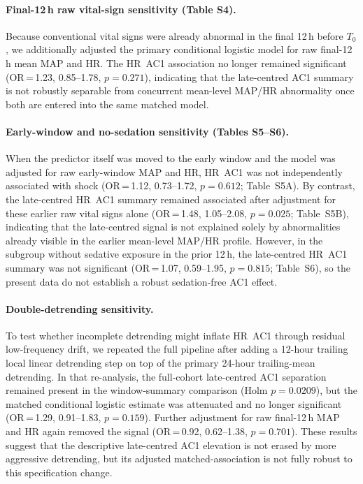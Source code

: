 \documentclass[referee,lineno,pdflatex]{sn-article-template/sn-jnl}
\begin{document}
\paragraph{Final-12\,h raw vital-sign sensitivity (Table S4).}
Because conventional vital signs were already abnormal in the final 12\,h before $T_0$,
we additionally adjusted the primary conditional logistic model for raw final-12\,h
mean MAP and HR.
The HR~AC1 association no longer remained significant
(OR\,=\,1.23, 0.85--1.78, $p=0.271$),
indicating that the late-centred AC1 summary is not robustly separable from concurrent mean-level MAP/HR
abnormality once both are entered into the same matched model.

\paragraph{Early-window and no-sedation sensitivity (Tables S5--S6).}
When the predictor itself was moved to the early window and the model was adjusted for
raw early-window MAP and HR, HR~AC1 was not independently associated with shock
(OR\,=\,1.12, 0.73--1.72, $p=0.612$; Table~S5A).
By contrast, the late-centred HR~AC1 summary remained associated after adjustment for these earlier
raw vital signs alone (OR\,=\,1.48, 1.05--2.08, $p=0.025$; Table~S5B),
indicating that the late-centred signal is not explained solely by abnormalities already
visible in the earlier mean-level MAP/HR profile.
However, in the subgroup without sedative exposure in the prior 12\,h,
the late-centred HR~AC1 summary was not significant
(OR\,=\,1.07, 0.59--1.95, $p=0.815$; Table~S6),
so the present data do not establish a robust sedation-free AC1 effect.

\paragraph{Double-detrending sensitivity.}
To test whether incomplete detrending might inflate HR~AC1 through residual low-frequency
drift, we repeated the full pipeline after adding a 12-hour trailing local linear
detrending step on top of the primary 24-hour trailing-mean detrending.
In that re-analysis, the full-cohort late-centred AC1 separation remained present in the
window-summary comparison (Holm $p=0.0209$), but the matched conditional logistic estimate
was attenuated and no longer significant (OR\,=\,1.29, 0.91--1.83, $p=0.159$).
Further adjustment for raw final-12\,h MAP and HR again removed the signal
(OR\,=\,0.92, 0.62--1.38, $p=0.701$).
These results suggest that the descriptive late-centred AC1 elevation is not erased by
more aggressive detrending, but its adjusted matched-association is not fully robust to
this specification change.
\end{document}
